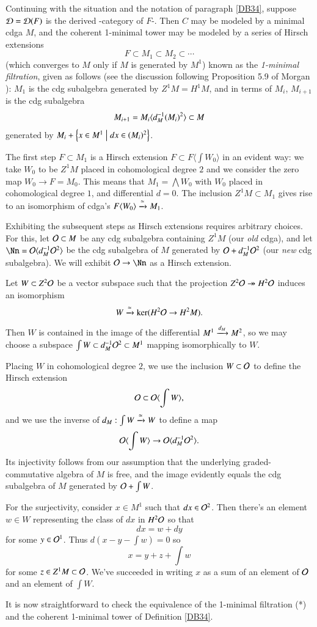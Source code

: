 \begin{ssExample}
\label{DB35}
Continuing with the situation and the notation of paragraph \ref{DB34}, suppose $\mathcal{D} = \mathcal{D}(F)$ is the derived \oo-category of $F$-\vectorspaces. Then $C$ may be modeled by a minimal cdga $M$, and the coherent 1-minimal tower may be modeled by a series of Hirsch extensions
\[
F \subset M_1 \subset M_2 \subset \cdots
\]
(which converges to $M$ only if $M$ is generated by $M^1$) known as the \emph{1-minimal filtration},
given as follows (see the discussion following Proposition 5.9 of Morgan \cite{Morgan}): $M_1$ is the cdg subalgebra generated by $Z^1M = H^1M$, and in terms of $M_i$, $M_{i+1}$ is the cdg subalgebra
\[
M_{i+1}=M_i \langle d_M^{-1} (M_i)^2 \rangle 
\subset M
\]
generated by $M_i + \left\{ x \in M^1 \; \middle| \; dx \in (M_i)^2 \right\}$.


The first step $F \subset M_1$ is a Hirsch extension $F \subset F \langle \int W_0 \rangle$ in an evident way: we take $W_0$ to be $Z^1M$ placed in cohomological degree $2$ and we consider the zero map $W_0 \to F = M_0$. This means that $M_1 = \bigwedge W_0$ with $W_0$ placed in cohomological degree $1$,  and differential $d = 0$. The inclusion $Z^1M \subset M_1$ gives rise to an isomorphism of cdga's $F \langle W_0 \rangle \xrightarrow{\simeq} M_1$. 

Exhibiting the subsequent steps as Hirsch extensions requires arbitrary choices. For this, let $\mathcal{O} \subset M$ be any cdg subalgebra containing $Z^1M$ (our \textit{old} cdga), and let $\Nn = \Oo \langle d_M\inv \Oo^2 \rangle$ be the cdg subalgebra of $M$ generated by $\mathcal{O} + d_M^{-1} \mathcal{O}^2$ (our \textit{new} cdg subalgebra). We will exhibit $\Oo \to \Nn$ as a Hirsch extension. 

Let $W \subset Z^2\mathcal{O}$ be a vector subspace such that the projection $Z^2\mathcal{O} \twoheadrightarrow H^2\mathcal{O}$ induces an isomorphism
\[
W \xrightarrow{\simeq} \ker ( H^2\mathcal{O} \to H^2 M).
\]
Then $W$ is contained in the image of the differential $M^1 \xrightarrow{d_M} M^2$, so we may choose a subspace $\int W \subset d_M^{-1} \mathcal{O}^2 \subset  M^1$ mapping isomorphically to $W$. 

Placing $W$ in cohomological degree $2$, we use the inclusion $W \subset \mathcal{O}$ to define the Hirsch extension
\[
\mathcal{O} \subset \mathcal{O} \langle \int W \rangle,
\]
and we use the inverse of $d_M: \int W \xrightarrow{\simeq} W$ to define a map 
\[
\mathcal{O} \langle \int W \rangle \to \mathcal{O} \langle d_M^{-1} \mathcal{O}^2 \rangle.
\]
Its injectivity follows from our assumption that the underlying graded-commutative algebra of $M$ is free, and the image evidently equals the cdg subalgebra of $M$ generated by $\mathcal{O} + \int W$.

For the surjectivity, consider $x \in M^1$ such that $dx \in \mathcal{O}^2$. Then there's an element $w \in W$ representing the class of $dx$ in $H^2\mathcal{O}$ so that
\[
dx = w + dy 
\]
for some $y \in \mathcal{O}^1$. Thus $d(x - y - \int w) = 0$ so 
\[
x =  y +z +\int w 
\]
for some $z \in Z^1M \subset \mathcal{O}$. We've succeeded in writing $x$ as a sum of an element of $\mathcal{O}$ and an element of $\int W$. 

It is now straightforward to check the equivalence of the 1-minimal filtration (*) and the coherent 1-minimal tower of Definition \ref{DB34}.
\end{ssExample}

